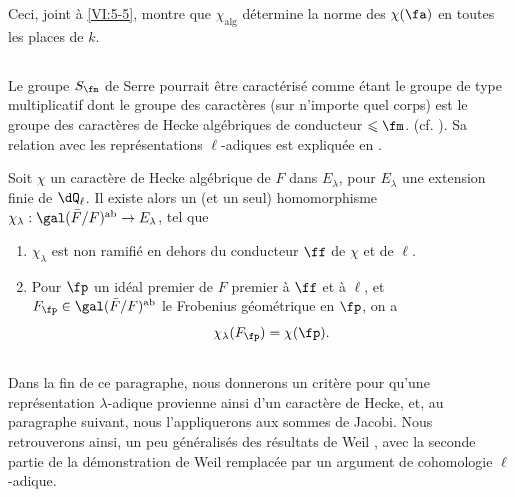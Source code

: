Ceci, joint à \ref{VI:5-5}, montre que $\chi_\text{alg}$ détermine la norme 
des $\chi(\fa)$ en toutes les places de $k$. 





\subsection{}\label{VI:5-7}

Le groupe $S_\fm$ de Serre pourrait être caractérisé comme étant le 
groupe de type multiplicatif dont le groupe des caractères (sur n'importe 
quel corps) est le groupe des caractères de Hecke algébriques de conducteur 
$\leqslant \fm$. (cf. \cite[II 2.1 et 2.2]{se68}). Sa relation avec les 
représentations $\ell$-adiques est expliquée en \cite[II 2.3]{se68}. 





\begin{theorem_}[{\cite{se68}}]\label{VI:5-8}
Soit $\chi$ un caractère de Hecke algébrique de $F$ dans $E_\lambda$, pour 
$E_\lambda$ une extension finie de $\dQ_\ell$. Il existe alors un (et un seul) 
homomorphisme $\chi_\lambda:\gal(\bar F/F)^\textnormal{ab} \to E_\lambda$, tel 
que 
\begin{enumerate}[\indent (i)]
  \item $\chi_\lambda$ est non ramifié en dehors du conducteur $\ff$ de 
    $\chi$ et de $\ell$. 
  \item Pour $\fp$ un idéal premier de $F$ premier à $\ff$ et à $\ell$, 
    et $F_\fp\in \gal(\bar F/F)^\textnormal{ab}$ le Frobenius géométrique 
    en $\fp$, on a 
    \[
      \chi_\lambda(F_\fp) = \chi(\fp) \text{.}
    \] 
\end{enumerate}
\end{theorem_}





\subsection{}\label{VI:5-9}

Dans la fin de ce paragraphe, nous donnerons un critère pour qu'une 
représentation $\lambda$-adique provienne ainsi d'un caractère de Hecke, 
et, au paragraphe suivant, nous l'appliquerons aux sommes de Jacobi. Nous 
retrouverons ainsi, un peu généralisés des résultats de Weil 
\cite{we52,we74-2}, avec la seconde partie de la démonstration de Weil 
remplacée par un argument de cohomologie $\ell$-adique. 





